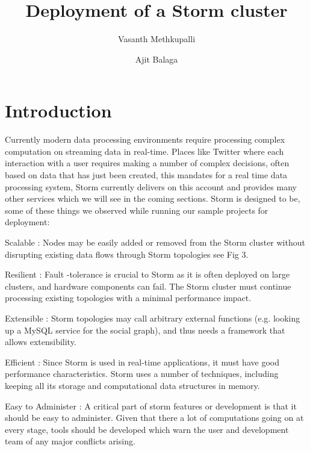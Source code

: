 \documentclass[9pt,twocolumn,twoside]{../../styles/osajnl}
\title{Deployment of a Storm cluster}
\author[1,*]{Vasanth Methkupalli}
\author[1,**]{Ajit Balaga}
\affil[1]{School of Informatics and Computing, Bloomington, IN 47408, U.S.A.}
\affil[*]{Corresponding authors: mvasanthiiit@gmail.com}
\affil[**]{Corresponding authors: ajit.balaga@gmail.com}
\begin{document}
\maketitle


\maketitle



\section*{Introduction}

Currently modern data processing environments require processing
complex computation on streaming data in real-time. Places like
Twitter where each interaction with a user requires making a number of
complex decisions, often based on data that has just been created,
this mandates for a real time data processing system, Storm currently
delivers on this account and provides many other services which we
will see in the coming sections. Storm is designed to be, some of
these things we observed while running our sample projects for
deployment:
\begin{description}
\item Scalable : Nodes may be easily added or removed
  from the Storm cluster without disrupting existing data flows
  through Storm topologies see Fig 3.
\item Resilient : Fault -tolerance is crucial to Storm as it is often
  deployed on large clusters, and hardware components can fail.  The
  Storm cluster must continue processing existing topologies with a
  minimal performance impact.
\item Extensible : Storm topologies may call arbitrary external
  functions (e.g. looking up a MySQL service for the social graph),
  \cite{bronson2013tao} and thus needs a framework that allows
  extensibility.
\item  Efficient : Since Storm is used in
  real-time applications, it must have good performance
  characteristics. Storm uses a number of techniques, including
  keeping all its storage and computational data structures in memory.
\item Easy to Administer : A critical part of storm features or
  development is that it should be easy to administer. Given that
  there a lot of computations going on at every stage, tools should be
  developed which warn the user and development team of any major
  conflicts arising.
\end{description}
\end{document}
